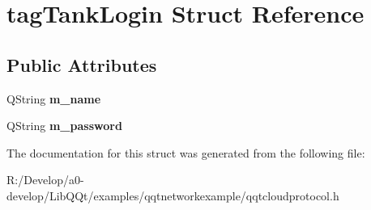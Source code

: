 \hypertarget{structtag_tank_login}{}\section{tag\+Tank\+Login Struct Reference}
\label{structtag_tank_login}
\subsection*{Public Attributes}
\begin{DoxyCompactItemize}
\item 
\mbox{\label{structtag_tank_login_ac0e405ec6db4c4f003bc1b1a2f1a01cf}} 
Q\+String {\bfseries m\+\_\+name}
\item 
\mbox{\label{structtag_tank_login_ae4fdfaca4fc5629ab0a6f01e81f3922d}} 
Q\+String {\bfseries m\+\_\+password}
\end{DoxyCompactItemize}


The documentation for this struct was generated from the following file\+:\begin{DoxyCompactItemize}
\item 
R\+:/\+Develop/a0-\/develop/\+Lib\+Q\+Qt/examples/qqtnetworkexample/qqtcloudprotocol.\+h\end{DoxyCompactItemize}
